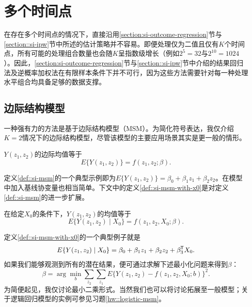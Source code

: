  
 
  
 
 
 
 

\section{多个时间点}


在存在多个时间点的情况下，直接沿用\ref{section:si-outcome-regression}节与\ref{section::si-ipw}节中所述的估计策略并不容易。即便处理仅为二值且仅有$K$个时间点，所有可能的处理组合数量也会随$K$呈指数级增长（例如$2^5 = 32$与$2^{10} = 1024$）。因此，\ref{section:si-outcome-regression}节与\ref{section::si-ipw}节中介绍的结果回归法及逆概率加权法在有限样本条件下并不可行，因为这些方法需要针对每一种处理水平组合均具备足够的数据支撑。 


\subsection{边际结构模型}

一种强有力的方法是基于边际结构模型（MSM）\citep{robins2000marginal, hernan2000marginal}。为简化符号表达，我仅介绍$K=2$情况下的边际结构模型，尽管该模型的主要应用场景其实是更一般的情形。 

\begin{definition}
[MSM]
\label{def::si-msm}
$Y(z_1, z_2)$的边际均值等于
$$
E\{  Y(z_1, z_2) \} = f(z_1,z_2; \beta). 
$$
\end{definition}


定义\ref{def::si-msm}的一个典型示例即为$E\{  Y(z_1, z_2) \} = \beta_0 + \beta_1 z_1 + \beta_2 z_2$。在模型中加入基线协变量也相当简单。下文中的定义\ref{def::si-msm-with-x0}是对定义\ref{def::si-msm}的进一步扩展。 

 \begin{definition}
[包含基线协变量的边际结构模型]
\label{def::si-msm-with-x0}
在给定$X_0$的条件下，$Y(z_1, z_2)$的均值等于
$$
E\{  Y(z_1, z_2) \mid X_0 \} = f(z_1,z_2, X_0; \beta). 
$$
\end{definition}

定义\ref{def::si-msm-with-x0}的一个典型例子就是\begin{equation}\label{eq::linear-msm}
E\{  Y(z_1, z_2)  \mid X_0\} = \beta_0 + \beta_1 z_1 + \beta_2 z_2 + \beta_3^{\mkern-1.5mu\mathsf{T}} X_0 .
\end{equation}  
如果我们能够观测到所有的潜在结果，便可通过求解下述最小化问题来得到$\beta$：\begin{equation}
\label{eq::beta-ols-msm}
\beta = \arg\min_b \sum_{z_2}\sum_{z_1}  E \{  Y(z_1, z_2) -  f(z_1,z_2, X_0; b)   \}^2 .
\end{equation}  
为简便起见，我仅讨论最小二乘形式。当然我们也可以将讨论拓展至一般模型；关于逻辑回归模型的实例可参见习题\ref{hw::logistic-msm}。 



